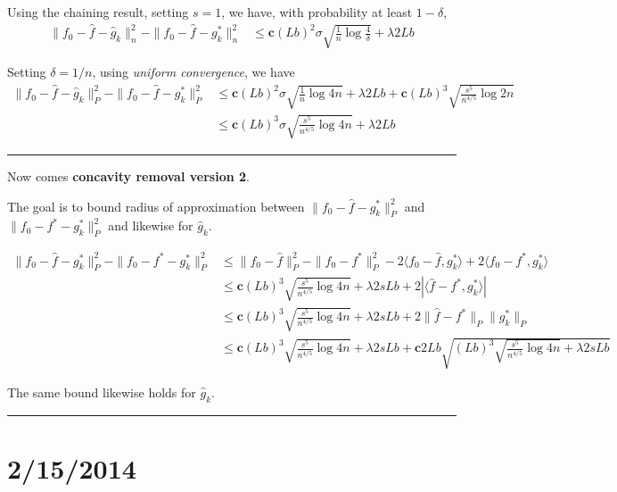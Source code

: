 \documentclass{article}
\begin{document}
{Using the chaining result, setting $s=1$, we have, with probability at least $1-\delta$,
\begin{align*}
\| f_0 - \hat{f} - \hat{g}_k \|_n^2 - \|f_0 - \hat{f} - g^*_k \|_n^2 &\leq
  \mathbf{c} (Lb)^2 \sigma \sqrt{ \frac{1}{n} \log \frac{4}{\delta} }+ \lambda 2 Lb
\end{align*}

Setting $\delta = 1/n$, using \emph{uniform convergence}, we have
\begin{align*}
\| f_0 - \hat{f} - \hat{g}_k \|_P^2 - \|f_0 - \hat{f} - g^*_k \|_P^2 &\leq
  \mathbf{c} (Lb)^2 \sigma \sqrt{ \frac{1}{n} \log 4n }+ \lambda 2 Lb +
  \mathbf{c} (Lb)^3 \sqrt{\frac{s^5}{n^{4/5}} \log 2n } \\
 &\leq \mathbf{c}(Lb)^3 \sigma \sqrt{\frac{s^5}{n^{4/5}} \log 4n} + \lambda 2 Lb
\end{align*}


\rule{5cm}{0.4pt}
\vspace{0.2in}

Now comes \textbf{concavity removal version 2}.

The goal is to bound radius of approximation between $\| f_0 - \hat{f} - g^*_k \|_P^2$ and $\| f_0 - f^* - g^*_k \|_P^2$ and likewise for $\hat{g}_k$.

\begin{align*}
\| f_0 - \hat{f} - g^*_k \|_P^2 - \| f_0 - f^* - g^*_k\|_P^2 &\leq 
    \| f_0 - \hat{f} \|_P^2 - \|f_0 - f^*\|_P^2 - 2\langle f_0 - \hat{f}, g^*_k \rangle
   + 2 \langle f_0 - f^*, g^*_k \rangle \\
 &\leq \mathbf{c} (Lb)^3 \sqrt{ \frac{s^5}{n^{4/5}} \log 4n} + \lambda 2 sLb + 
    2 | \langle \hat{f} - f^*, g^*_k \rangle |  \\
 &\leq  \mathbf{c} (Lb)^3 \sqrt{ \frac{s^5}{n^{4/5}} \log 4n} + \lambda 2 sLb + 
    2 \| \hat{f} - f^* \|_P \| g^*_k \|_P \\
&\leq  \mathbf{c} (Lb)^3 \sqrt{ \frac{s^5}{n^{4/5}} \log 4n} + \lambda 2 sLb +
   \mathbf{c} 2Lb \sqrt{ (Lb)^3 \sqrt{ \frac{s^5}{n^{4/5}} \log 4n} + \lambda 2sLb} 
\end{align*}

The same bound likewise holds for $\hat{g}_k$.

\rule{5cm}{0.4pt}
\vspace{0.2in}








\newpage
\section{2/15/2014}

}
\end{document}
